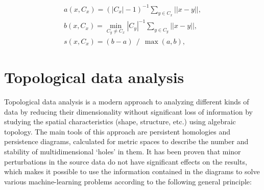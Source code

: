 \documentclass[10pt,lettersize,journal]{IEEEtran}
\begin{document}
\begin{subequations}
\label{eq1}
\begin{align}
    a(x, C_x) = {(|C_x| - 1)} ^ {-1} \sum_{y \in C_x} ||x - y||, \label{eq1:A}\\
    b(x, C_x) = \min_{C_y \ne C_x} {|C_y|} ^ {-1} \sum_{y \in C_y} ||x - y||, \label{eq1:B}\\
    s(x, C_x) = (b - a)~~/~~\max(a, b), \label{eq1:C}
\end{align}
\end{subequations}

\section{Topological data analysis}

Topological data analysis is a modern approach to analyzing different kinds of data by reducing their dimensionality without significant loss of information by studying the spatial characteristics (shape, structure, etc.) using algebraic topology. The main tools of this approach are persistent homologies and persistence diagrams, calculated for metric spaces to describe the number and stability of multidimensional `holes' in them. It has been proven that minor perturbations in the source data do not have significant effects on the results, which makes it possible to use the information contained in the diagrams to solve various machine-learning problems according to the following general principle:
\end{document}
